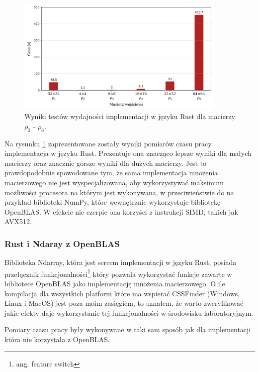 \documentclass[11pt, a4paper]{article}
\begin{document}
\begin{sloppypar}
    \FloatBarrier
    \begin{figure}[ht]
      \centering
      \includegraphics[width=0.9\textwidth]{"resources/rust_performance_tests.png"}
      \caption{Wyniki testów wydajności implementacji w języku Rust dla macierzy $\rho_{2}$ - $\rho
      _{6}$.}
      \label{fourth-perf}
    \end{figure}
    \FloatBarrier

    Na rysunku \ref{fourth-perf} zaprezentowane zostały wyniki pomiarów czasu pracy
    implementacja w języku Rust. Prezentuje ona znacząco lepsze wyniki dla małych macierzy
    oraz znacznie gorsze wyniki dla dużych macierzy. Jest to prawdopodobnie spowodowane
    tym, że sama implementacja mnożenia macierzowego nie jest wyspecjalizowana, aby
    wykorzystywać maksimum możliwości procesora na którym jest wykonywana, w przeciwieństwie
    do na przykład biblioteki NumPy, które wewnętrznie wykorzystuje bibliotekę OpenBLAS\cite{NumPy_Doc}.
    W efekcie nie czerpie ona korzyści z instrukcji SIMD, takich jak AVX512.

    \subsubsection{ Rust i Ndaray z OpenBLAS }


    Biblioteka Ndarray, która jest sercem implementacji w języku Rust, posiada przełącznik
    funkcjonalności\footnote{ang. feature switch} który pozwala wykorzystać funkcje
    zawarte w bibliotece OpenBLAS jako implementację mnożenia macierzowego. O ile kompilacja
    dla wszystkich platform które ma wspierać CSSFinder (Windows, Linux i MacOS) jest
    poza moim zasięgiem, to uznałem, że warto zweryfikować jakie efekty daje
    wykorzystanie tej funkcjonalności w środowisku laboratoryjnym.

    Pomiary czasu pracy były wykonywane w taki sam sposób jak dla implementacji która
    nie korzystała z OpenBLAS.


\end{sloppypar}
\end{document}
